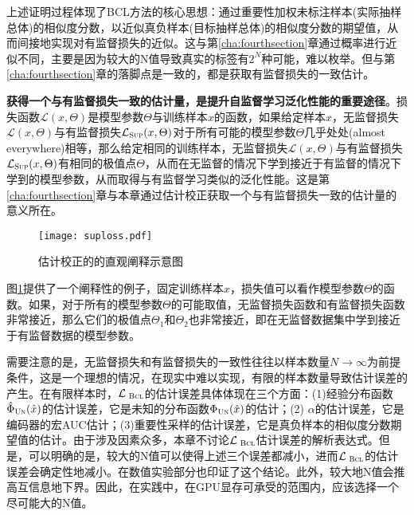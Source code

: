 上述证明过程体现了BCL方法的核心思想：通过重要性加权未标注样本(实际抽样总体)的相似度分数，以近似真负样本(目标抽样总体)的相似度分数的期望值，从而间接地实现对有监督损失的近似。这与第\ref{cha:fourthsection}章通过概率进行近似不同，主要是因为较大的N值导致真实的标签有$2^N$种可能，难以枚举。但与第\ref{cha:fourthsection}章的落脚点是一致的，都是获取有监督损失的一致估计。

\textbf{获得一个与有监督损失一致的估计量，是提升自监督学习泛化性能的重要途径}。损失函数$\mathcal{L}(x,\Theta)$是模型参数$\Theta$与训练样本$x$的函数，如果给定样本$x$，无监督损失$\mathcal{L}(x,\Theta)$与有监督损失$\mathcal{L}_\textsc{Sup}(x,\Theta)$对于所有可能的模型参数$\Theta$几乎处处(almost everywhere)相等，那么给定相同的训练样本，无监督损失$\mathcal{L}(x,\Theta)$与有监督损失$\mathcal{L}_\textsc{Sup}(x,\Theta)$有相同的极值点$\Theta$，从而在无监督的情况下学到接近于有监督的情况下学到的模型参数，从而取得与有监督学习类似的泛化性能。这是第\ref{cha:fourthsection}章与本章通过估计校正获取一个与有监督损失一致的估计量的意义所在。
\begin{figure}[!]
	\centering
	\texttt{[image: suploss.pdf]}
	\caption{估计校正的的直观阐释示意图}
	\label{Fig:suploss}
\end{figure}

图\ref{Fig:suploss}提供了一个阐释性的例子，固定训练样本$x$，损失值可以看作模型参数$\Theta$的函数。如果，对于所有的模型参数$\Theta$的可能取值，无监督损失函数和有监督损失函数非常接近，那么它们的极值点$\Theta_1$和$\Theta_2$也非常接近，即在无监督数据集中学到接近于有监督数据的模型参数。

需要注意的是，无监督损失和有监督损失的一致性往往以样本数量$N\rightarrow \infty$为前提条件，这是一个理想的情况，在现实中难以实现，有限的样本数量导致估计误差的产生。在有限样本时，$\mathcal{L}_\textsc{~Bcl}$的估计误差具体体现在三个方面：(1)经验分布函数$\hat{\Phi}_\textsc{Un}(\hat{x})$的估计误差，它是未知的分布函数${\Phi}_\textsc{Un}(\hat{x})$的估计；(2) $\alpha$的估计误差，它是编码器的宏AUC估计；(3)重要性采样的估计误差，它是真负样本的相似度分数期望值的估计。由于涉及因素众多，本章不讨论$\mathcal{L}_\textsc{~Bcl}$估计误差的解析表达式。但是，可以明确的是，较大的N值可以使得上述三个误差都减小，进而$\mathcal{L}_\textsc{~Bcl}$的估计误差会确定性地减小。在数值实验部分也印证了这个结论。此外，较大地N值会推高互信息地下界。因此，在实践中，在GPU显存可承受的范围内，应该选择一个尽可能大的N值。

